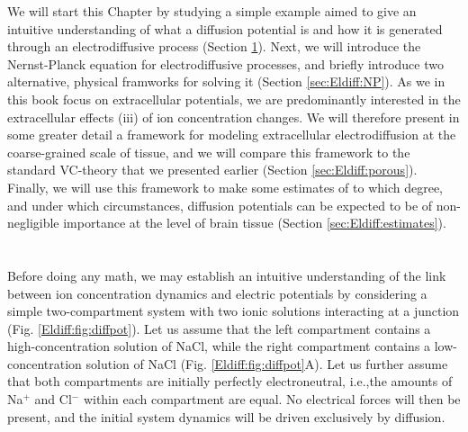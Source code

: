 We will start this Chapter by studying a simple example aimed to give an intuitive understanding of what a diffusion potential is and how it is generated through an electrodiffusive process (Section \ref{sec:Eldiff:LJpot}). Next, we will introduce the Nernst-Planck equation for electrodiffusive processes, and briefly introduce two alternative, physical framworks for solving it (Section \ref{sec:Eldiff:NP}). As we in this book focus on extracellular potentials, we are predominantly interested in the extracellular effects (iii) of ion concentration changes. We  will therefore present in some greater detail a framework for modeling extracellular electrodiffusion at the coarse-grained scale of tissue, and we will compare this framework to the standard VC-theory that we presented earlier (Section \ref{sec:Eldiff:porous}). Finally, we will use this framework to make some estimates of to which degree, and under which circumstances, diffusion potentials can be expected to be of non-negligible importance at the level of brain tissue (Section \ref{sec:Eldiff:estimates}).


\section{}
\label{sec:Eldiff:LJpot}
Before doing any math, we may establish an intuitive understanding of the link between ion concentration dynamics and electric potentials by considering a simple two-compartment system with two ionic solutions interacting at a junction  (Fig. \ref{Eldiff:fig:diffpot}). Let us assume that the left compartment contains a high-concentration solution of NaCl, while the right compartment contains a low-concentration solution of NaCl (Fig. \ref{Eldiff:fig:diffpot}A). Let us further assume that both compartments are initially perfectly electroneutral, i.e.,the amounts of Na$^+$ and Cl$^-$ within each compartment are equal. No  electrical forces will then be present, and the initial system dynamics will be driven exclusively by diffusion. 


